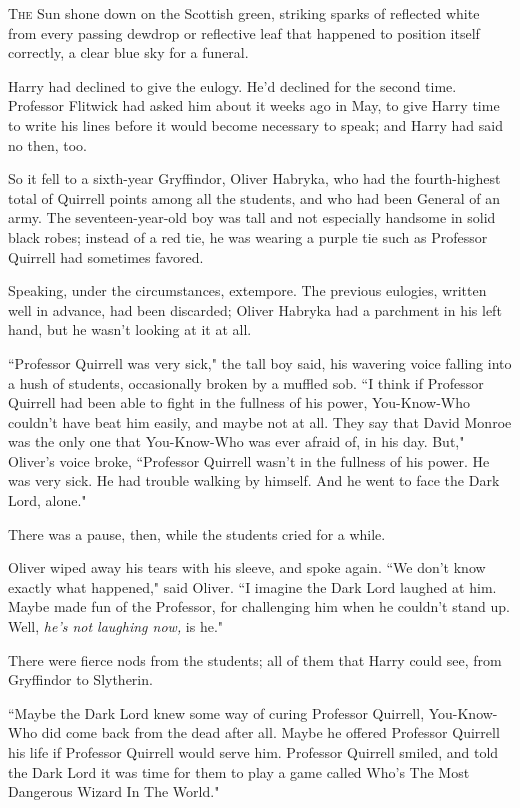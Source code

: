 
\lettrine{T}{he} Sun shone down on the Scottish green, striking sparks of reflected white from every passing dewdrop or reflective leaf that happened to position itself correctly, a clear blue sky for a funeral.

Harry had declined to give the eulogy. He'd declined for the second time. Professor Flitwick had asked him about it weeks ago in May, to give Harry time to write his lines before it would become necessary to speak; and Harry had said no then, too.

So it fell to a sixth-year Gryffindor, Oliver Habryka, who had the fourth-highest total of Quirrell points among all the students, and who had been General of an army. The seventeen-year-old boy was tall and not especially handsome in solid black robes; instead of a red tie, he was wearing a purple tie such as Professor Quirrell had sometimes favored.

Speaking, under the circumstances, extempore. The previous eulogies, written well in advance, had been discarded; Oliver Habryka had a parchment in his left hand, but he wasn't looking at it at all.

``Professor Quirrell was very sick," the tall boy said, his wavering voice falling into a hush of students, occasionally broken by a muffled sob. ``I think if Professor Quirrell had been able to fight in the fullness of his power, You-Know-Who couldn't have beat him easily, and maybe not at all. They say that David Monroe was the only one that You-Know-Who was ever afraid of, in his day. But," Oliver's voice broke, ``Professor Quirrell wasn't in the fullness of his power. He was very sick. He had trouble walking by himself. And he went to face the Dark Lord, alone."

There was a pause, then, while the students cried for a while.

Oliver wiped away his tears with his sleeve, and spoke again. ``We don't know exactly what happened," said Oliver. ``I imagine the Dark Lord laughed at him. Maybe made fun of the Professor, for challenging him when he couldn't stand up. Well, \emph{he's not laughing now,} is he."

There were fierce nods from the students; all of them that Harry could see, from Gryffindor to Slytherin.

``Maybe the Dark Lord knew some way of curing Professor Quirrell, You-Know-Who did come back from the dead after all. Maybe he offered Professor Quirrell his life if Professor Quirrell would serve him. Professor Quirrell smiled, and told the Dark Lord it was time for them to play a game called Who's The Most Dangerous Wizard In The World."

